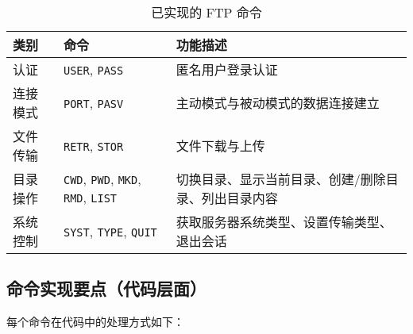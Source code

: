 \documentclass[a4paper,10pt]{article} %
\begin{document}
\begin{table}[h!]
    \centering
    \begin{tabular}{lll}
        \toprule
        \textbf{类别} & \textbf{命令} & \textbf{功能描述} \\
        \midrule
        认证 & \verb|USER|, \verb|PASS| & 匿名用户登录认证 \\
        连接模式 & \verb|PORT|, \verb|PASV| & 主动模式与被动模式的数据连接建立 \\
        文件传输 & \verb|RETR|, \verb|STOR| & 文件下载与上传 \\
        目录操作 & \verb|CWD|, \verb|PWD|, \verb|MKD|, \verb|RMD|, \verb|LIST| & 切换目录、显示当前目录、创建/删除目录、列出目录内容 \\
        系统控制 & \verb|SYST|, \verb|TYPE|, \verb|QUIT| & 获取服务器系统类型、设置传输类型、退出会话 \\
        \bottomrule
    \end{tabular}
    \caption{已实现的 FTP 命令}
\end{table}


\subsection{命令实现要点（代码层面）}
每个命令在代码中的处理方式如下：
\end{document}
